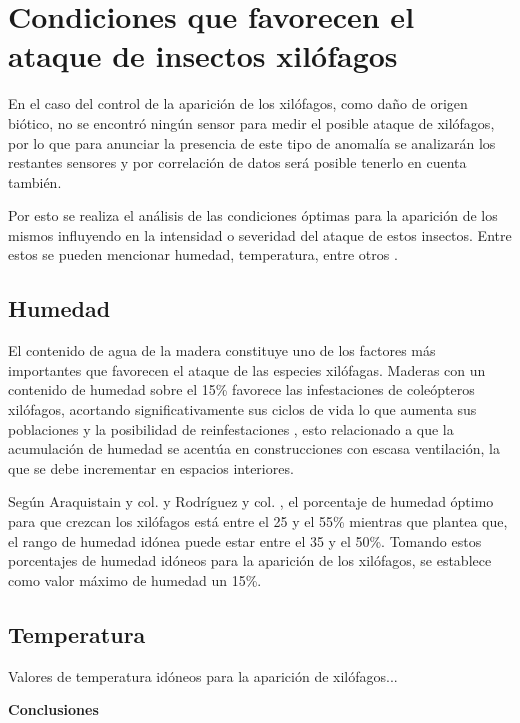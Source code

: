 

    \section{Condiciones que favorecen el ataque de insectos xilófagos}

    En el caso del control de la aparición de los xilófagos, como daño de origen biótico, no se encontró ningún sensor para medir el posible ataque de xilófagos, por lo que para anunciar la presencia de este tipo de anomalía se analizarán los restantes sensores y por correlación de datos será posible tenerlo en cuenta también.
    
    Por esto se realiza el análisis de las condiciones óptimas para la aparición de los mismos influyendo en la intensidad o severidad del ataque de estos insectos. Entre estos se pueden mencionar humedad, temperatura, entre otros \cite{ripa2004termitas}. 
    
    \subsection{Humedad}

    El contenido de agua de la madera constituye uno de los factores más importantes que favorecen el ataque de las especies xilófagas. Maderas con un contenido de humedad sobre el 15\% favorece las infestaciones de coleópteros xilófagos, acortando significativamente sus ciclos de vida lo que aumenta sus poblaciones y la posibilidad de reinfestaciones \cite{ripa2004termitas}, esto relacionado a que la acumulación de humedad se acentúa en construcciones con escasa ventilación, la que se debe incrementar en espacios interiores.

    Según Araquistain y col. \cite{monitoringMoisture} y Rodríguez y col. \cite{rodriguezcodigo}, el porcentaje de humedad óptimo para que crezcan los xilófagos está entre el 25 y el 55\% mientras que \cite{woodPreservation} plantea que, el rango de humedad idónea puede estar entre el 35 y el 50\%. Tomando estos porcentajes de humedad idóneos para la aparición de los xilófagos, se establece como valor máximo de humedad un 15\%.

    \subsection{Temperatura}

    Valores de temperatura idóneos para la aparición de xilófagos...



    \textbf{\Large Conclusiones}\newline